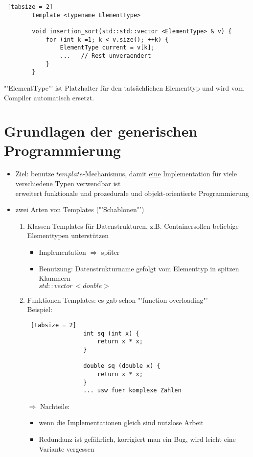 \documentclass{article}
\begin{document}
	\begin{lstlisting} [tabsize = 2]
		template <typename ElementType>
		
		void insertion_sort(std::std::vector <ElementType> & v) {
			for (int k =1; k < v.size(); ++k) {
				ElementType current = v[k];
				...   // Rest unveraendert
			}
		}
	\end{lstlisting}
	
	"'ElementType"' ist Platzhalter für den tatsächlichen Elementtyp und wird vom Compiler automatisch ersetzt.
	
	
	\section{Grundlagen der generischen Programmierung}
	
	\begin{itemize}
		\item Ziel: benutze $template$-Mechanismus, damit \underline{eine} Implementation für viele verschiedene Typen verwendbar ist \\
		erweitert funktionale und prozedurale und objekt-orientierte Programmierung
		\item zwei Arten von Templates ("'Schablonen"')
		\begin{enumerate}
			\item Klassen-Templates für Datenstrukturen, z.B. Containersollen beliebige Elementtypen unterstützen
			\begin{itemize}
				\item Implementation $\Rightarrow$ später
				\item Benutzung: Datenstrukturname gefolgt vom Elementtyp in spitzen Klammern \\
				$std::vector\, <double>$
			\end{itemize}
			\item Funktionen-Templates: es gab schon "'function overloading"' \\
			Beispiel:
			\begin{lstlisting} [tabsize = 2]
				int sq (int x) {
					return x * x;
				}
				
				double sq (double x) {
					return x * x;
				}
				... usw fuer komplexe Zahlen
			\end{lstlisting}
			$\Rightarrow$ Nachteile:
			\begin{itemize}
				\item wenn die Implementationen gleich sind nutzlose Arbeit
				\item Redundanz ist gefährlich, korrigiert man ein Bug, wird leicht eine Variante vergessen
			\end{itemize}
		\end{enumerate}
	\end{itemize}
			
\end{document}

